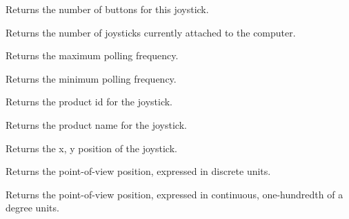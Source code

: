 
Returns the number of buttons for this joystick.

\label{wxjoystickgetnumberjoysticks}


Returns the number of joysticks currently attached to the computer.

\label{wxjoystickgetpollingmax}


Returns the maximum polling frequency.

\label{wxjoystickgetpollingmin}


Returns the minimum polling frequency.

\label{wxjoystickgetproductid}


Returns the product id for the joystick.

\label{wxjoystickgetproductname}


Returns the product name for the joystick.

\label{wxjoystickgetposition}


Returns the x, y position of the joystick.

\label{wxjoystickgetpovposition}


Returns the point-of-view position, expressed in discrete units.

\label{wxjoystickgetpovctsposition}


Returns the point-of-view position, expressed in continuous, one-hundredth of a degree units.

\label{wxjoystickgetruddermax}


